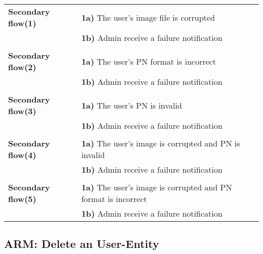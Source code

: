 \documentclass[a4paper,11pt]{article}
\begin{document}
\begin{tabular}{|p{3.5cm}|p{11.5cm}|}
    \textbf{Secondary flow(1)} &
    \textbf{1a)} The user's image file is corrupted \\&
    \textbf{1b)} Admin receive a failure notification

    \\ \hline \rowcolor{Gray} & \\ \hline

    \textbf{Secondary flow(2)} &
    \textbf{1a)} The user's PN format is incorrect \\&
    \textbf{1b)} Admin receive a failure notification

   \\ \hline \rowcolor{Gray} & \\ \hline

    \textbf{Secondary flow(3)} &
    \textbf{1a)} The user's PN is invalid \\&
    \textbf{1b)} Admin receive a failure notification

    \\ \hline \rowcolor{Gray} & \\ \hline

    \textbf{Secondary flow(4)} &
    \textbf{1a)} The user's image is corrupted and PN is invalid\\&
    \textbf{1b)} Admin receive a failure notification

    \\ \hline \rowcolor{Gray} & \\ \hline

    \textbf{Secondary flow(5)} &
    \textbf{1a)} The user's image is corrupted and PN format is incorrect\\&
    \textbf{1b)} Admin receive a failure notification

    \\\hline
\end{tabular}


\newpage
\noindent

\subsection{ARM: Delete an User-Entity}
\end{document}
